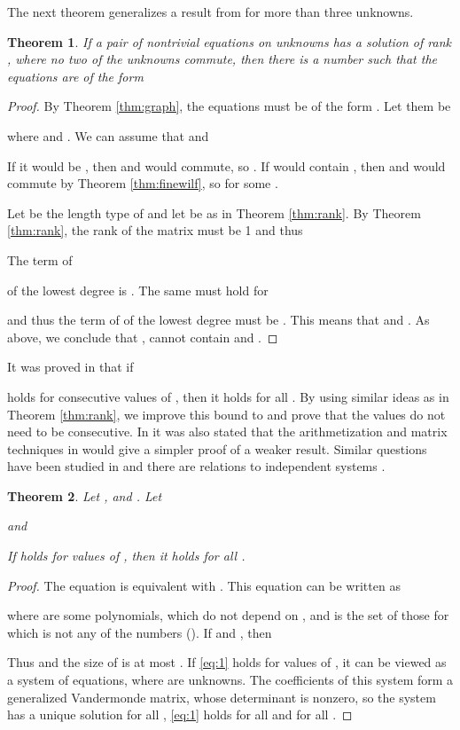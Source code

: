 \documentclass[submission]{eptcs}
\newtheorem{theorem}{Theorem}[section]
\theoremstyle{definition}
\begin{document}
The next theorem generalizes a result from \cite{CzKa07} for more
than three unknowns.

\begin{theorem}
If a pair of nontrivial equations on  unknowns has a solution 
of rank , where no two of the unknowns commute, then there is a
number  such that the equations are of the form

\end{theorem}
\begin{proof}
By Theorem \ref{thm:graph}, the equations must be of the form . Let them be

where  and . We can assume that  and

If it would be , then  and 
would commute, so . If  would contain
, then  and  would commute by Theorem
\ref{thm:finewilf}, so  for some .

Let  be the length type of  and let  be as in Theorem
\ref{thm:rank}. By Theorem \ref{thm:rank}, the rank of the matrix
 must be 1 and thus

The term of

of the lowest degree is . The same must hold for

and thus the term of  of the lowest degree must be
. This means that  and  . As above, we conclude that ,  cannot contain  and .
\end{proof}

It was proved in \cite{Ko98} that if

holds for  consecutive values of , then it holds for all
. By using similar ideas as in Theorem \ref{thm:rank}, we improve
this bound to  and prove that the values do not need to be
consecutive. In \cite{Ko98} it was also stated that the
arithmetization and matrix techniques in \cite{Tu87} would give a
simpler proof of a weaker result. Similar questions have been
studied in \cite{HoKo07} and there are relations to independent
systems \cite{Pl03}.

\begin{theorem}
Let ,  and . Let

and

If  holds for  values of , then it holds for all
.
\end{theorem}
\begin{proof}
The equation  is equivalent with .
This equation can be written as

where  are some polynomials, which do not depend on ,
and  is the set of those  for which  is not any of the numbers  (). If  and , then

Thus  and the size of  is at
most . If \eqref{eq:1} holds for  values
of , it can be viewed as a system of equations, where 
are unknowns. The coefficients of this system form a generalized
Vandermonde matrix, whose determinant is nonzero, so the system has
a unique solution  for all , \eqref{eq:1} holds
for all  and  for all .
\end{proof}
\end{document}
